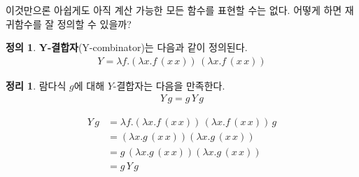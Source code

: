 \documentclass[b5paper]{book}
\theoremstyle{definition}
\newtheorem{defn}{정의}[chapter]
\newtheorem{thm}{정리}[chapter]
\newenvironment{pf*}{\pushQED{\qed}\pf}{\popQED\endpf}
\begin{document}
이것만으론 아쉽게도 아직 계산 가능한 모든 함수를 표현할 수는 없다. 어떻게 하면 재귀함수를 잘 정의할
수 있을까? 
\begin{defn}
    \textbf{Y-결합자}(Y-combinator)는 다음과 같이 정의된다.
    \begin{align*}
        Y = \lambda f.(\lambda x. f \, (x\, x)) \, (\lambda x. f \, (x \, x))
    \end{align*}
\end{defn}
\begin{thm}
    람다식 $g$에 대해 $Y$-결합자는 다음을 만족한다.
    \begin{align*}
        Y \, g = g \, Y \, g
    \end{align*}
\end{thm}
\begin{pf*}
    \begin{align*}
        Y \, g &= \lambda f.(\lambda x. f \, (x\, x)) \, (\lambda x. f \, (x \, x)) \, g \\
        &= (\lambda x. g \, (x \, x)) (\lambda x .g \, (x \, x)) \\ 
        &= g \,  (\lambda x. g \, (x \, x)) (\lambda x .g \, (x \, x))  \\ 
        &= g \, Y \, g
    \end{align*}
\end{pf*}
\end{document}
